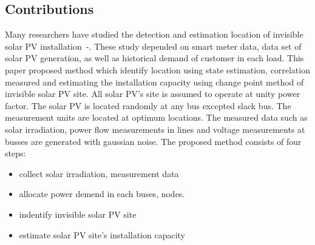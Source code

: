 \subsection{Contributions}
Many researchers have studied the detection and estimation location of invisible solar PV installation~\cite{b11}-\cite{b14}.
These study depended on smart meter data, data set of solar PV generation, as well as historical demand of customer in each load.
This paper proposed method which identify location using state estimation, correlation measured and estimating the installation capacity using change point method of invisible solar PV site.
All solar PV's site is assumed to operate at unity power factor.
The solar PV is located randomly at any bus excepted slack bus.
The measurement units are located at optimum locations.
The measured data such as solar irradiation, power flow measurements in lines and voltage measurements at busses are generated with gaussian noise.
The proposed method consists of four steps:
\begin{itemize}
  \item collect solar irradiation, measurement data
  \item allocate power demend in each buses, nodes.
  \item indentify invisible solar PV site
  \item estimate solar PV site's installation capacity
\end{itemize}
